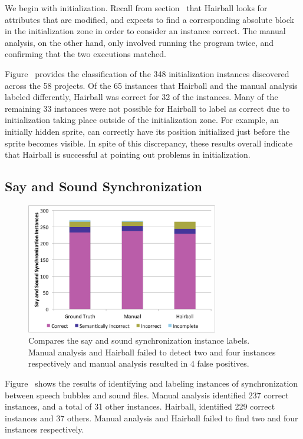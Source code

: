 We begin with initialization. Recall from section~ that
Hairball looks for attributes that are modified, and expects to find a
corresponding absolute block in the initialization zone in order to consider an
instance correct. The manual analysis, on the other hand, only involved running
the program twice, and confirming that the two executions matched.

Figure~ provides the classification of the 348
initialization instances discovered across the 58 projects. Of the 65 instances
that Hairball and the manual analysis labeled differently, Hairball was correct
for 32 of the instances. Many of the remaining 33 instances were not possible
for Hairball to label as correct due to initialization taking place outside of
the initialization zone. For example, an initially hidden sprite, can correctly
have its position initialized just before the sprite becomes visible. In spite
of this discrepancy, these results overall indicate that Hairball is successful
at pointing out problems in initialization.

\subsection{Say and Sound Synchronization}
\begin{figure}[!t]
\centering \includegraphics[trim=.3in .15in .3in .15in, clip,
  width=3.3in]{graphs/AutoSaySoundSync.eps}
\caption{Compares the say and sound synchronization instance labels. Manual
  analysis and Hairball failed to detect two and four instances respectively
  and manual analysis resulted in 4 false positives.}
\end{figure}


Figure~ shows the results of identifying and
labeling instances of synchronization between speech bubbles and sound
files. Manual analysis identified 237 correct instances, and a total of 31
other instances. Hairball, identified 229 correct instances and 37
others. Manual analysis and Hairball failed to find two and four instances
respectively.


